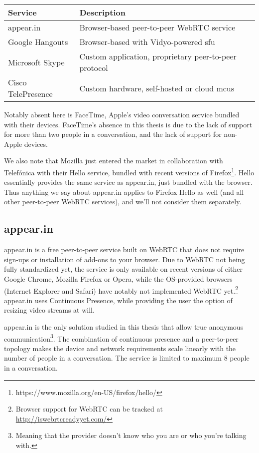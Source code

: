 \begin{center}
	\label{tab:existing-solutions}
	\begin{tabular}{| l | l |}
		\hline
		\textbf{Service} & \textbf{Description} \\ \hline
		appear.in & Browser-based peer-to-peer WebRTC service \\ \hline
		Google Hangouts & Browser-based with Vidyo-powered \gls{sfu} \\ \hline
		Microsoft Skype & Custom application, proprietary peer-to-peer protocol \\ \hline
		Cisco TelePresence & Custom hardware, self-hosted or cloud \glspl{mcu} \\ \hline
	\end{tabular}
\end{center}

Notably absent here is FaceTime, Apple's video conversation service bundled with their devices. FaceTime's absence in this thesis is due to the lack of support for more than two people in a conversation, and the lack of support for non-Apple devices.

We also note that Mozilla just entered the market in collaboration with Telefónica with their Hello service, bundled with recent versions of Firefox\footnote{https://www.mozilla.org/en-US/firefox/hello/}. Hello essentially provides the same service as appear.in, just bundled with the browser. Thus anything we say about appear.in applies to Firefox Hello as well (and all other peer-to-peer WebRTC services), and we'll not consider them separately.

\subsection{appear.in}

appear.in is a free peer-to-peer service built on WebRTC that does not require sign-ups or installation of add-ons to your browser. Due to WebRTC not being fully standardized yet, the service is only available on recent versions of either Google Chrome, Mozilla Firefox or Opera, while the OS-provided browsers (Internet Explorer and Safari) have notably not implemented WebRTC yet.\footnote{Browser support for WebRTC can be tracked at \url{http://iswebrtcreadyyet.com/}} appear.in uses Continuous Presence, while providing the user the option of resizing video streams at will.

appear.in is the only solution studied in this thesis that allow true anonymous communication\footnote{Meaning that the provider doesn't know who you are or who you're talking with.}. The combination of continuous presence and a peer-to-peer topology makes the device and network requirements scale linearly with the number of people in a conversation. The service is limited to maximum 8 people in a conversation.


